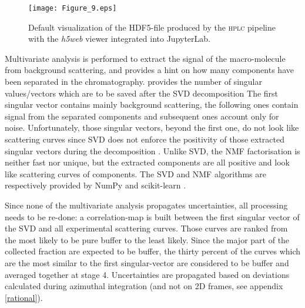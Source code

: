 \documentclass[preprint]{iucr}              %
\begin{document}
\begin{figure}
    \label{hplc}
    \texttt{[image: Figure\_9.eps]}
    \caption{Default visualization of the HDF5-file produced by the \textsc{hplc} pipeline with the \textit{h5web} viewer integrated into JupyterLab.}
\end{figure}

Multivariate analysis is performed to extract the signal of the macro-molecule from background scattering, and provides a hint on how many components have been separated in the chromatography.
 provides the number of singular values/vectors which are to be saved after the SVD decomposition
The first singular vector contains mainly background scattering, the following ones contain signal from the separated components and subsequent ones account only for noise.
Unfortunately, those singular vectors, beyond the first one, do not look like scattering curves since SVD does not enforce the positivity of those extracted singular vectors during the decomposition \cite{NNMF_spectro}. 
Unlike SVD, the NMF factorisation is neither fast nor unique, but the extracted components are all positive and look like scattering curves of components. 
The SVD and NMF algorithms are respectively provided by NumPy \cite{numpy} and scikit-learn \cite{sklearn}.


Since none of the multivariate analysis propagates uncertainties, all processing needs to be re-done:
a correlation-map is built between the first singular vector of the SVD and all experimental scattering curves. 
Those curves are ranked from the most likely to be pure buffer to the least likely. 
Since the major part of the collected fraction are expected to be buffer, the thirty percent of the curves which are the most similar to the first singular-vector are considered to be buffer and averaged together at stage 4.
Uncertainties are propagated based on deviations calculated during azimuthal integration (and not on 2D frames, see appendix \ref{rational}).
\end{document}
